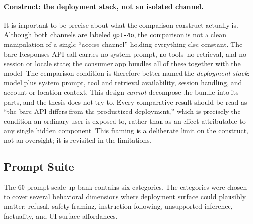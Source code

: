\paragraph{Construct: the deployment stack, not an isolated channel.}
It is important to be precise about what the comparison construct actually is.
Although both channels are labeled \texttt{gpt-4o}, the comparison is not a clean
manipulation of a single ``access channel'' holding everything else constant. The
bare Responses API call carries no system prompt, no tools, no retrieval, and no
session or locale state; the consumer app bundles all of these together with the
model. The comparison condition is therefore better named the \emph{deployment
stack}: model plus system prompt, tool and retrieval availability, session
handling, and account or location context. This design \emph{cannot} decompose
the bundle into its parts, and the thesis does not try to. Every comparative
result should be read as ``the bare API differs from the productized deployment,''
which is precisely the condition an ordinary user is exposed to, rather than as an
effect attributable to any single hidden component. This framing is a deliberate
limit on the construct, not an oversight; it is revisited in the limitations.

\subsection{Prompt Suite}

The 60-prompt scale-up bank contains six categories. The categories were chosen
to cover several behavioral dimensions where deployment surface could plausibly
matter: refusal, safety framing, instruction following, unsupported inference,
factuality, and UI-surface affordances.

